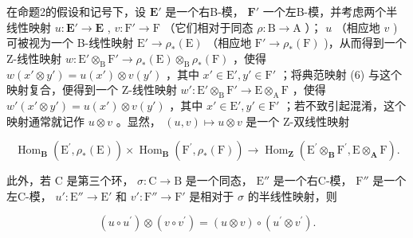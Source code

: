 在命题2的假设和记号下，设 \(\mathbf{E}'\) 是一个右B-模， \(\mathbf{F}'\) 一个左B-模，并考虑两个半线性映射 \(u: \mathbf{E}' \to \mathbf{E}\) , \(v: \mathrm{F}' \to \mathrm{F}\) （它们相对于同态 \(\rho: \mathrm{B} \to \mathrm{A}\) ）； \(u\) （相应地 \(v\) ) 可被视为一个 B-线性映射 \(\mathrm{E}' \to \rho_*(\mathrm{E})\) （相应地 \(\mathrm{F}' \to \rho_*(\mathrm{F})\) )，从而得到一个 Z-线性映射 \(w: \mathrm{E}' \otimes_{\mathrm{B}} \mathrm{F}' \to \rho_*(\mathrm{E}) \otimes_{\mathrm{B}} \rho_*(\mathrm{F})\) ，使得 \(w(x' \otimes y') = u(x') \otimes v(y')\) ，其中 \(x' \in \mathrm{E}', y' \in \mathrm{F}'\) ；将典范映射 (6) 与这个映射复合，便得到一个 Z-线性映射 \(w': \mathrm{E}' \otimes_{\mathrm{B}} \mathrm{F}' \to \mathrm{E} \otimes_{\mathrm{A}} \mathrm{F}\) ，使得 \(w'(x' \otimes y') = u(x') \otimes v(y')\) ，其中 \(x' \in \mathrm{E}', y' \in \mathrm{F}'\) ；若不致引起混淆，这个映射通常就记作 \(u \otimes v\) 。显然， \((u, v) \mapsto u \otimes v\) 是一个 Z-双线性映射

\[
\operatorname{Hom} _ {\mathbf {B}} \left(\mathrm{E} ^ {\prime}, \rho_ {*} (\mathrm{E})\right) \times \operatorname{Hom} _ {\mathbf {B}} \left(\mathrm{F} ^ {\prime}, \rho_ {*} (\mathrm{F})\right)\rightarrow \operatorname{Hom} _ {\mathbf {Z}} \left(\mathrm{E} ^ {\prime} \otimes_ {\mathbf {B}} \mathrm{F} ^ {\prime}, \mathrm{E} \otimes_ {\mathbf {A}} \mathrm{F}\right).
\]

此外，若 C 是第三个环， \(\sigma: \mathrm{C} \to \mathrm{B}\) 是一个同态， \(\mathrm{E}''\) 是一个右C-模， \(\mathrm{F}''\) 是一个左C-模， \(u': \mathrm{E}'' \to \mathrm{E}'\) 和 \(v': \mathrm{F}'' \to \mathrm{F}'\) 是相对于 \(\sigma\) 的半线性映射，则

\[
(u \circ u ^ {\prime}) \otimes (v \circ v ^ {\prime}) = (u \otimes v) \circ (u ^ {\prime} \otimes v ^ {\prime}).
\]


